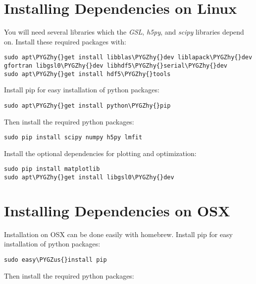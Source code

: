 \documentclass[letterpaper,10pt,openany,oneside]{sphinxmanual}
\def\PYGZus{\char`\_}
\def\PYGZhy{\char`\-}
\begin{document}
\section{Installing Dependencies on Linux}
\label{install:installing-dependencies-on-linux}
You will need several libraries which the \emph{GSL}, \emph{h5py}, and \emph{scipy} libraries
depend on. Install these required packages with:

\begin{Verbatim}[commandchars=\\\{\}]
sudo apt\PYGZhy{}get install libblas\PYGZhy{}dev liblapack\PYGZhy{}dev gfortran libgsl0\PYGZhy{}dev libhdf5\PYGZhy{}serial\PYGZhy{}dev
sudo apt\PYGZhy{}get install hdf5\PYGZhy{}tools
\end{Verbatim}

Install pip for easy installation of python packages:

\begin{Verbatim}[commandchars=\\\{\}]
sudo apt\PYGZhy{}get install python\PYGZhy{}pip
\end{Verbatim}

Then install the required python packages:

\begin{Verbatim}[commandchars=\\\{\}]
sudo pip install scipy numpy h5py lmfit
\end{Verbatim}

Install the optional dependencies for plotting and optimization:

\begin{Verbatim}[commandchars=\\\{\}]
sudo pip install matplotlib
sudo apt\PYGZhy{}get install libgsl0\PYGZhy{}dev
\end{Verbatim}


\section{Installing Dependencies on OSX}
\label{install:installing-dependencies-on-osx}
Installation on OSX can be done easily with homebrew. Install pip for easy
installation of python packages:

\begin{Verbatim}[commandchars=\\\{\}]
sudo easy\PYGZus{}install pip
\end{Verbatim}

Then install the required python packages:
\end{document}

